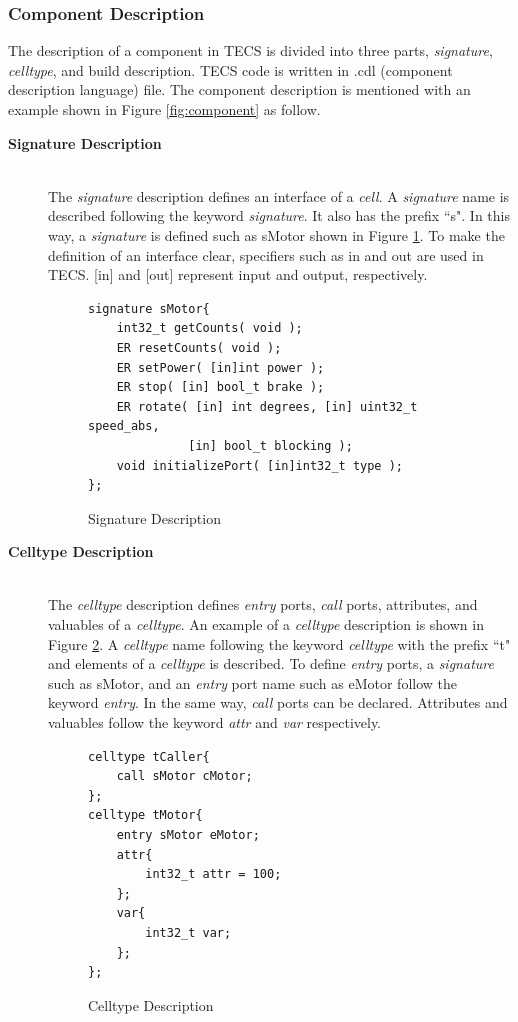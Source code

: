 \documentclass[submit]{ipsj_v2/UTF8/ipsj}
\begin{document}
\subsubsection{Component Description}
The description of a component in TECS is divided into three parts, {\it signature}, {\it celltype}, and build description.
TECS code is written in .cdl (component description language) file.
The component description is mentioned with an example shown in Figure \ref{fig:component} as follow.

\begin{description}
    \item[{\bf Signature Description}]\mbox{}\\
        The {\it signature} description defines an interface of a {\it cell}.
        A {\it signature} name is described following the keyword {\it signature}.
        It also has the prefix ``s".
        In this way, a {\it signature} is defined such as sMotor shown in Figure \ref{signature}.
        To make the definition of an interface clear, specifiers such as in and out are used in TECS.
        [in] and [out] represent input and output, respectively.\\
\begin{figure}[t]
\centering
\begin{lstlisting}
signature sMotor{
    int32_t getCounts( void );
    ER resetCounts( void );
    ER setPower( [in]int power );
    ER stop( [in] bool_t brake );
    ER rotate( [in] int degrees, [in] uint32_t speed_abs,
              [in] bool_t blocking );
    void initializePort( [in]int32_t type );
};
\end{lstlisting}
\caption{Signature Description}
\label{signature}
\end{figure}

    \item[{\bf Celltype Description}]\mbox{}\\
        The {\it celltype} description defines {\it entry} ports, {\it call} ports, attributes, and valuables of a {\it celltype}.
        An example of a {\it celltype} description is shown in Figure \ref{celltype}.
        A {\it celltype} name following the keyword {\it celltype} with the prefix ``t" and elements of a {\it celltype} is described.
        To define {\it entry} ports, a {\it signature} such as sMotor, and an {\it entry} port name such as eMotor follow the keyword {\it entry}.
        In the same way, {\it call} ports can be declared.
        Attributes and valuables follow the keyword {\it attr} and {\it var} respectively.\\
\begin{figure}[t]
\centering
\begin{lstlisting}
celltype tCaller{
    call sMotor cMotor;
};
celltype tMotor{
    entry sMotor eMotor;
    attr{
        int32_t attr = 100;
    };
    var{
        int32_t var;
    };
};
\end{lstlisting}
\caption{Celltype Description}
\label{celltype}
\end{figure}


\end{description}
\end{document}
